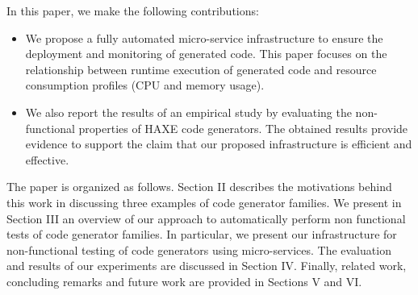 In this paper, we make the following contributions:
\begin{itemize} 	
	
	\item We propose a fully automated micro-service infrastructure to ensure the deployment and monitoring of generated code. This paper focuses on the relationship between runtime execution of generated code and resource consumption profiles (CPU and memory usage).
	\item We also report the results of an empirical study by evaluating the non-functional properties of HAXE code generators. The obtained results provide evidence to support the claim that our proposed infrastructure is efficient and effective.	
\end{itemize}

The paper is organized as follows.
Section II describes the motivations behind this work in discussing three examples of code generator families. We present in Section III an overview of our approach to automatically perform non functional tests of code generator families. In particular, we present our infrastructure for non-functional testing of code generators using micro-services. 
The evaluation and results of our experiments are discussed in Section IV. 
Finally, related work, concluding remarks and future work are provided in Sections V and VI.

